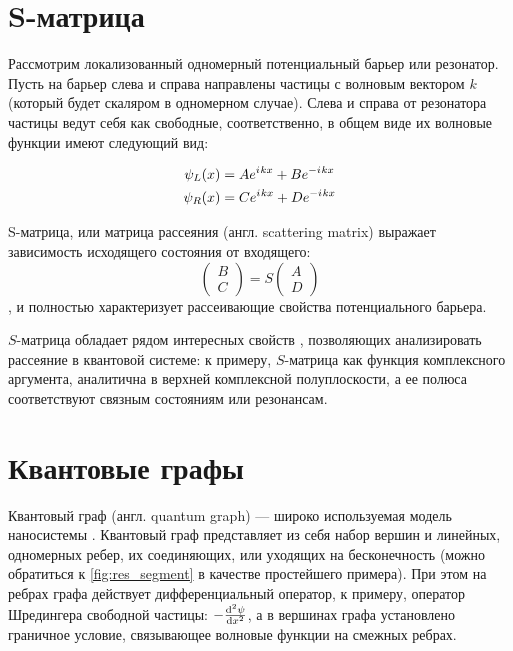 \section{S-матрица}\label{sec:smatrix}
Рассмотрим локализованный одномерный потенциальный барьер или резонатор. Пусть на барьер слева и справа направлены частицы с волновым вектором $k$ (который будет скаляром в одномерном случае). Слева и справа от резонатора частицы ведут себя как свободные, соответственно, в общем виде их волновые функции имеют следующий вид:

\begin{equation}\label{eq:wlwl}
\begin{aligned}
   \psi_L(x) &= A \eexp{\iu k x} + B \eexp{-\iu k x}
\\ \psi_R(x) &= C \eexp{\iu k x} + D \eexp{-\iu k x}
\end{aligned}
\end{equation}

S-матрица, или  матрица рассеяния (англ. scattering matrix) выражает зависимость исходящего состояния от входящего:
\begin{equation}\label{eq:smatrix}
\begin{pmatrix} B \\ C \end{pmatrix} = S \begin{pmatrix} A \\ D \end{pmatrix}
\end{equation}
, и полностью характеризует рассеивающие свойства потенциального барьера.

$S$-матрица обладает рядом интересных свойств \cite[стр. 75]{perelomov1998quantum}, позволяющих анализировать рассеяние в квантовой системе: к примеру, $S$-матрица как функция комплексного аргумента, аналитична в верхней комплексной полуплоскости, а ее полюса соответствуют связным состояниям или резонансам.

\section{Квантовые графы}
Квантовый граф (англ. quantum graph) — широко используемая модель наносистемы \cite{kuchment2002graph, lobanov2013genetic, brown2010analysis}. Квантовый граф представляет из себя набор вершин и линейных, одномерных ребер, их соединяющих, или уходящих на бесконечность (можно обратиться к \autoref{fig:res_segment} в качестве простейшего примера). При этом на ребрах графа действует дифференциальный оператор, к примеру, оператор Шредингера свободной частицы: $-\dv[2]{\psi}{x}$, а в вершинах графа установлено граничное условие, связывающее волновые функции на смежных ребрах.

